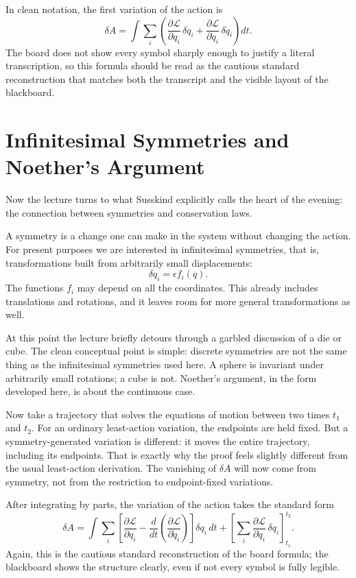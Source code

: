 In clean notation, the first variation of the action is
\begin{equation}
\delta A
=
\int
\sum_i
\left(
\frac{\partial \mathcal{L}}{\partial q_i}\,\delta q_i
+
\frac{\partial \mathcal{L}}{\partial \dot q_i}\,\delta \dot q_i
\right)dt.
\end{equation}
The board does not show every symbol sharply enough to justify a literal transcription, so this formula should be read as the cautious standard reconstruction that matches both the transcript and the visible layout of the blackboard.

\section{Infinitesimal Symmetries and Noether's Argument}

Now the lecture turns to what Susskind explicitly calls the heart of the evening: the connection between symmetries and conservation laws.

A symmetry is a change one can make in the system without changing the action. For present purposes we are interested in infinitesimal symmetries, that is, transformations built from arbitrarily small displacements:
\begin{equation}
\delta q_i=\epsilon f_i(q).
\end{equation}
The functions \(f_i\) may depend on all the coordinates. This already includes translations and rotations, and it leaves room for more general transformations as well.

At this point the lecture briefly detours through a garbled discussion of a die or cube. The clean conceptual point is simple: discrete symmetries are not the same thing as the infinitesimal symmetries used here. A sphere is invariant under arbitrarily small rotations; a cube is not. Noether's argument, in the form developed here, is about the continuous case.

Now take a trajectory that solves the equations of motion between two times \(t_1\) and \(t_2\). For an ordinary least-action variation, the endpoints are held fixed. But a symmetry-generated variation is different: it moves the entire trajectory, including its endpoints. That is exactly why the proof feels slightly different from the usual least-action derivation. The vanishing of \(\delta A\) will now come from symmetry, not from the restriction to endpoint-fixed variations.

After integrating by parts, the variation of the action takes the standard form
\begin{equation}
\delta A
=
\int
\sum_i
\left[
\frac{\partial \mathcal{L}}{\partial q_i}
-
\frac{d}{dt}
\left(
\frac{\partial \mathcal{L}}{\partial \dot q_i}
\right)
\right]
\delta q_i\,dt
+
\left[
\sum_i
\frac{\partial \mathcal{L}}{\partial \dot q_i}\,\delta q_i
\right]_{t_1}^{t_2}.
\end{equation}
Again, this is the cautious standard reconstruction of the board formula; the blackboard shows the structure clearly, even if not every symbol is fully legible.

